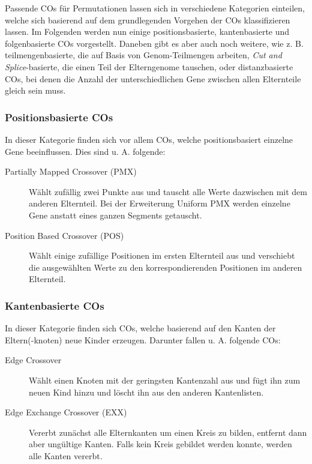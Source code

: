 	Passende COs für Permutationen lassen sich in verschiedene Kategorien einteilen, welche sich basierend auf dem grundlegenden Vorgehen der COs klassifizieren lassen. Im Folgenden werden nun einige positionsbasierte, kantenbasierte und folgenbasierte COs vorgestellt. Daneben gibt es aber auch noch weitere, wie z. B. teilmengenbasierte, die auf Basis von Genom-Teilmengen arbeiten, \textit{Cut and Splice}-basierte, die einen Teil der Elterngenome tauschen, oder distanzbasierte COs, bei denen die Anzahl der unterschiedlichen Gene zwischen allen Elternteile gleich sein muss.
	
	\subsubsection{Positionsbasierte COs}
	
		In dieser Kategorie finden sich vor allem COs, welche positionsbasiert einzelne Gene beeinflussen. Dies sind u. A. folgende:
		
		\begin{description}
			\item[Partially Mapped Crossover (PMX)] Wählt zufällig zwei Punkte aus und tauscht alle Werte dazwischen mit dem anderen Elternteil. Bei der Erweiterung Uniform PMX werden einzelne Gene anstatt eines ganzen Segments getauscht.\cite{GAforTSP}\cite{COforPermutations}\cite{COforQAP}
			\item[Position Based Crossover (POS)] Wählt einige zufällige Positionen im ersten Elternteil aus und verschiebt die ausgewählten Werte zu den korrespondierenden Positionen im anderen Elternteil.\cite{COforPermutations}
		\end{description}
		
	\subsubsection{Kantenbasierte COs}
	
		In dieser Kategorie finden sich COs, welche basierend auf den Kanten der Eltern(-knoten) neue Kinder erzeugen. Darunter fallen u. A. folgende COs:
		
		\begin{description}
			\item[Edge Crossover] Wählt einen Knoten mit der geringsten Kantenzahl aus und fügt ihn zum neuen Kind hinzu und löscht ihn aus den anderen Kantenlisten.\cite{COforPermutations}
			\item[Edge Exchange Crossover (EXX)] Vererbt zunächst alle Elternkanten um einen Kreis zu bilden, entfernt dann aber ungültige Kanten. Falls kein Kreis gebildet werden konnte, werden alle Kanten vererbt.\cite{EdgeCOforTSP}
		\end{description}
	
